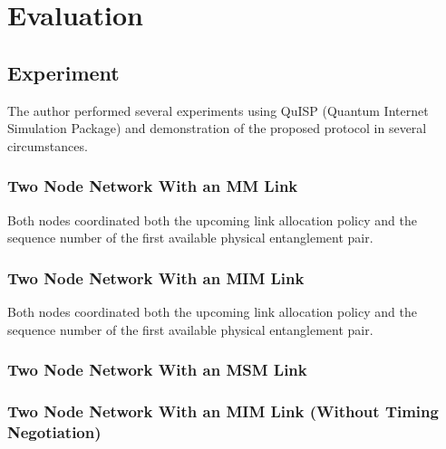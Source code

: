 \chapter{Evaluation}
\label{evaluation}

\section{Experiment}

The author performed several experiments using QuISP (Quantum Internet Simulation Package) and demonstration of the proposed protocol in several circumstances.

\subsection{Two Node Network With an MM Link}
Both nodes coordinated both the upcoming link allocation policy and the sequence number of the first available physical entanglement pair.

\subsection{Two Node Network With an MIM Link}
Both nodes coordinated both the upcoming link allocation policy and the sequence number of the first available physical entanglement pair.

\subsection{Two Node Network With an MSM Link}
\subsection{Two Node Network With an MIM Link (Without Timing Negotiation)}



